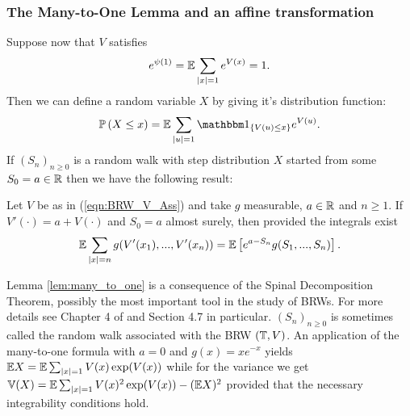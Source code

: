 \subsubsection{The Many-to-One Lemma and an affine transformation}

Suppose now that $V$ satisfies
\begin{equation}\label{eqn:BRW_V_Ass}
e^{\psi(1)} = \mathbb{E} \sum\limits_{|x|=1} e^{V(x)} = 1. 
\end{equation}
Then we can define a random variable $X$ by giving it's distribution function: 
\begin{equation}
\Pr{X \leq x} = \E \sum\limits_{|u| = 1} \Ind_{\{V(u) \leq x\}} e^{V(u)}. 
\end{equation}
If $(S_n)_{n\geq0}$ is a random walk with step distribution $X$ started from some $S_0 = a \in \mathbb{R}$ then we have the following result:
\begin{lemma}\label{lem:many_to_one}
Let $V$ be as in (\ref{eqn:BRW_V_Ass}) and take $g$ measurable, $a \in \mathbb{R}$ and $n \geq 1$. If $V'(\cdot) = a + V(\cdot)$ and $S_0 = a$ almost surely, then provided the integrals exist 
\begin{equation}
\mathbb{E} \sum\limits_{|x| = n} g(V'(x_1), ...,V'(x_n)) = \mathbb{E}\left[ e^{a-S_n} g(S_1, ...,S_n) \right]. 
\end{equation}
\end{lemma}

Lemma \ref{lem:many_to_one} is a consequence of the Spinal Decomposition Theorem, possibly the most important tool in the study of BRWs. For more details see Chapter 4 of \cite{shi2015branching} and Section 4.7 in particular. $(S_n)_{n\geq0}$ is sometimes called the random walk associated with the BRW $(\mathbb{T}, V)$. An application of the many-to-one formula with $a=0$ and $g(x) = x e^{-x}$ yields $\mathbb{E} X = \mathbb{E} \sum_{|x|=1} V(x) \exp(V(x))$ while for the variance we get $\mathbb{V}(X) = \mathbb{E} \sum_{|x|=1} V(x)^2 \exp(V(x)) - (\mathbb{E} X)^2$ provided that the necessary integrability conditions hold. \\


